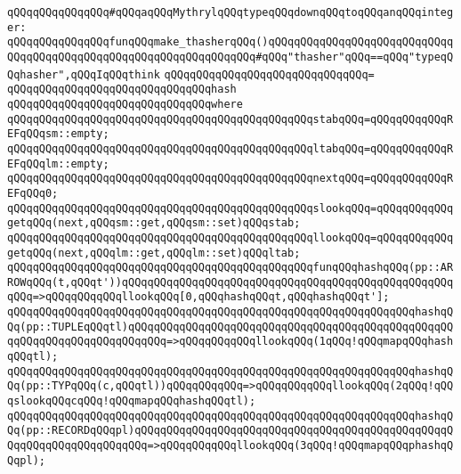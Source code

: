 \verb|qQQqqQQqqQQqqQQq#qQQqaqQQqMythrylqQQqtypeqQQqdownqQQqtoqQQqanqQQqinteger:|\newline
\newline
\verb|qQQqqQQqqQQqqQQqfunqQQqmake_thasherqQQq()qQQqqQQqqQQqqQQqqQQqqQQqqQQqqQQqqQQqqQQqqQQqqQQqqQQqqQQqqQQqqQQqqQQq#qQQq"thasher"qQQq==qQQq"typeqQQqhasher",qQQqIqQQqthink|\newline
\verb|qQQqqQQqqQQqqQQqqQQqqQQqqQQqqQQq=|\newline
\verb|qQQqqQQqqQQqqQQqqQQqqQQqqQQqqQQqhash|\newline
\verb|qQQqqQQqqQQqqQQqqQQqqQQqqQQqqQQqwhere|\newline
\verb|qQQqqQQqqQQqqQQqqQQqqQQqqQQqqQQqqQQqqQQqqQQqqQQqstabqQQq=qQQqqQQqqQQqREFqQQqsm::empty;|\newline
\verb|qQQqqQQqqQQqqQQqqQQqqQQqqQQqqQQqqQQqqQQqqQQqqQQqltabqQQq=qQQqqQQqqQQqREFqQQqlm::empty;|\newline
\newline
\verb|qQQqqQQqqQQqqQQqqQQqqQQqqQQqqQQqqQQqqQQqqQQqqQQqnextqQQq=qQQqqQQqqQQqREFqQQq0;|\newline
\newline
\verb|qQQqqQQqqQQqqQQqqQQqqQQqqQQqqQQqqQQqqQQqqQQqqQQqslookqQQq=qQQqqQQqqQQqgetqQQq(next,qQQqsm::get,qQQqsm::set)qQQqstab;|\newline
\verb|qQQqqQQqqQQqqQQqqQQqqQQqqQQqqQQqqQQqqQQqqQQqqQQqllookqQQq=qQQqqQQqqQQqgetqQQq(next,qQQqlm::get,qQQqlm::set)qQQqltab;|\newline
\newline
\verb|qQQqqQQqqQQqqQQqqQQqqQQqqQQqqQQqqQQqqQQqqQQqqQQqfunqQQqhashqQQq(pp::ARROWqQQq(t,qQQqt'))qQQqqQQqqQQqqQQqqQQqqQQqqQQqqQQqqQQqqQQqqQQqqQQqqQQqqQQq=>qQQqqQQqqQQqllookqQQq[0,qQQqhashqQQqt,qQQqhashqQQqt'];|\newline
\verb|qQQqqQQqqQQqqQQqqQQqqQQqqQQqqQQqqQQqqQQqqQQqqQQqqQQqqQQqqQQqqQQqhashqQQq(pp::TUPLEqQQqtl)qQQqqQQqqQQqqQQqqQQqqQQqqQQqqQQqqQQqqQQqqQQqqQQqqQQqqQQqqQQqqQQqqQQqqQQqqQQq=>qQQqqQQqqQQqllookqQQq(1qQQq!qQQqmapqQQqhashqQQqtl);|\newline
\verb|qQQqqQQqqQQqqQQqqQQqqQQqqQQqqQQqqQQqqQQqqQQqqQQqqQQqqQQqqQQqqQQqhashqQQq(pp::TYPqQQq(c,qQQqtl))qQQqqQQqqQQq=>qQQqqQQqqQQqllookqQQq(2qQQq!qQQqslookqQQqcqQQq!qQQqmapqQQqhashqQQqtl);|\newline
\verb|qQQqqQQqqQQqqQQqqQQqqQQqqQQqqQQqqQQqqQQqqQQqqQQqqQQqqQQqqQQqqQQqhashqQQq(pp::RECORDqQQqpl)qQQqqQQqqQQqqQQqqQQqqQQqqQQqqQQqqQQqqQQqqQQqqQQqqQQqqQQqqQQqqQQqqQQqqQQq=>qQQqqQQqqQQqllookqQQq(3qQQq!qQQqmapqQQqphashqQQqpl);|\newline
